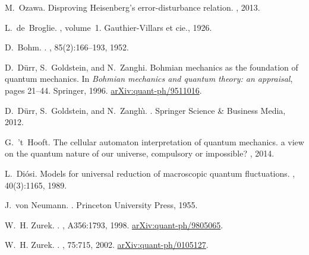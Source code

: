 \documentclass[12pt]{amsart}
\theoremstyle{definition}
\theoremstyle{plain}
\begin{document}
\begin{thebibliography}{10}
M.~Ozawa.
\newblock Disproving {H}eisenberg's error-disturbance relation.
, 2013.

L.~de~Broglie.
, volume~1.
\newblock Gauthier-Villars et cie., 1926.

D.~Bohm.
.
, 85(2):166--193, 1952.

D.~D{\"u}rr, S.~Goldstein, and N.~Zanghi.
\newblock Bohmian mechanics as the foundation of quantum mechanics.
\newblock In {\em Bohmian mechanics and quantum theory: an appraisal}, pages
  21--44. Springer, 1996.
\newblock \href{http://arxiv.org/abs/quant-ph/9511016}{arXiv:quant-ph/9511016}.

D.~D{\"u}rr, S.~Goldstein, and N.~Zangh{\`\i}.
.
\newblock Springer Science \& Business Media, 2012.

G.~'t~Hooft.
\newblock The cellular automaton interpretation of quantum mechanics. a view on
  the quantum nature of our universe, compulsory or impossible?
, 2014.

L.~Di{\'o}si.
\newblock Models for universal reduction of macroscopic quantum fluctuations.
, 40(3):1165, 1989.

J.~von Neumann.
.
\newblock Princeton University Press, 1955.

W.~H. Zurek.
.
, A356:1793, 1998.
\newblock \href{http://arxiv.org/abs/quant-ph/9805065}{arXiv:quant-ph/9805065}.

W.~H. Zurek.
.
, 75:715, 2002.
\newblock \href{http://arxiv.org/abs/quant-ph/0105127}{arXiv:quant-ph/0105127}.


\end{thebibliography}
\end{document}
